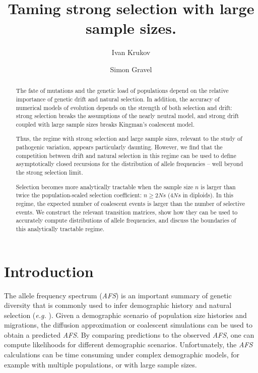 \documentclass[review]{elsarticle}
\begin{document}
\begin{frontmatter}
  \title{ Taming strong selection with large sample sizes. }

  \author{Ivan Krukov}
  \author{Simon Gravel}

  \begin{abstract}
    The fate of mutations and the genetic load of populations depend on the relative importance of
    genetic drift and natural selection. In addition, the accuracy of numerical models of evolution
    depends on the strength of both selection and drift: strong selection breaks the assumptions of
    the nearly neutral model, and strong drift coupled with large sample sizes breaks
    Kingman's coalescent model.
  
    Thus, the regime with strong selection and large sample sizes, relevant 
    to the study of pathogenic variation, appears particularly daunting.
    However, we find that the competition between drift and natural selection in this regime can be
    used to define asymptotically closed recursions for the distribution of allele
    frequencies -- well beyond the strong selection limit.
 
    Selection becomes more analytically tractable when the sample size $n$ is larger than twice the
    population-scaled selection coefficient: $n \ge 2Ns$ ($4Ns$ in diploids). In this regime, the
    expected number of coalescent events is larger than the number of selective events. 
    We construct the relevant transition matrices, show how they can be used to accurately compute
    distributions of allele frequencies, and discuss the boundaries of this analytically tractable
    regime. 
  \end{abstract}

\end{frontmatter}

\section{Introduction}
\label{sec_introduciton}

The allele frequency spectrum (\textit{AFS}) is an important summary of genetic diversity that is
commonly used to infer demographic history and natural selection (\textit{e.g.}
\cite{GutenkunstEtAl2009, KammEtAl2017, JouganousEtAl2017}). Given a demographic scenario of
population size histories and migrations, the diffusion approximation or coalescent simulations can
be used to obtain a predicted \textit{AFS}. By comparing predictions to the observed \textit{AFS},
one can compute likelihoods for different demographic scenarios. Unfortunately, the \textit{AFS}
calculations can be time consuming under complex demographic models, for example with multiple
populations, or with large sample sizes.
\end{document}
